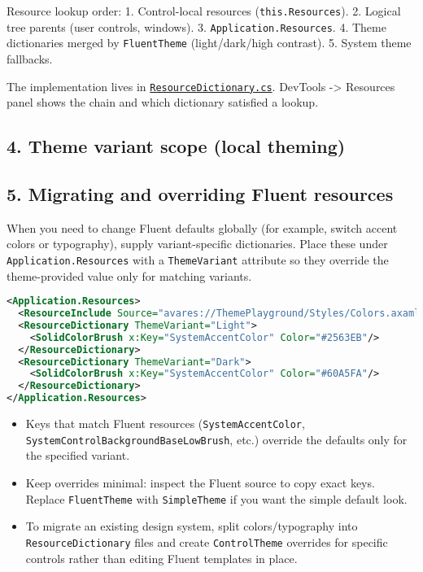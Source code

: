 Resource lookup order: 1. Control-local resources
(\passthrough{\lstinline!this.Resources!}). 2. Logical tree parents
(user controls, windows). 3.
\passthrough{\lstinline!Application.Resources!}. 4. Theme dictionaries
merged by \passthrough{\lstinline!FluentTheme!} (light/dark/high
contrast). 5. System theme fallbacks.

The implementation lives in
\href{https://github.com/AvaloniaUI/Avalonia/blob/master/src/Avalonia.Base/Resources/ResourceDictionary.cs}{\passthrough{\lstinline!ResourceDictionary.cs!}}.
DevTools -\textgreater{} Resources panel shows the chain and which
dictionary satisfied a lookup.

\subsection{4. Theme variant scope (local
theming)}\label{theme-variant-scope-local-theming}

\subsection{5. Migrating and overriding Fluent
resources}\label{migrating-and-overriding-fluent-resources}

When you need to change Fluent defaults globally (for example, switch
accent colors or typography), supply variant-specific dictionaries.
Place these under \passthrough{\lstinline!Application.Resources!} with a
\passthrough{\lstinline!ThemeVariant!} attribute so they override the
theme-provided value only for matching variants.

\begin{lstlisting}[language=XML]
<Application.Resources>
  <ResourceInclude Source="avares://ThemePlayground/Styles/Colors.axaml"/>
  <ResourceDictionary ThemeVariant="Light">
    <SolidColorBrush x:Key="SystemAccentColor" Color="#2563EB"/>
  </ResourceDictionary>
  <ResourceDictionary ThemeVariant="Dark">
    <SolidColorBrush x:Key="SystemAccentColor" Color="#60A5FA"/>
  </ResourceDictionary>
</Application.Resources>
\end{lstlisting}

\begin{itemize}
\tightlist
\item
  Keys that match Fluent resources
  (\passthrough{\lstinline!SystemAccentColor!},
  \passthrough{\lstinline!SystemControlBackgroundBaseLowBrush!}, etc.)
  override the defaults only for the specified variant.
\item
  Keep overrides minimal: inspect the Fluent source to copy exact keys.
  Replace \passthrough{\lstinline!FluentTheme!} with
  \passthrough{\lstinline!SimpleTheme!} if you want the simple default
  look.
\item
  To migrate an existing design system, split colors/typography into
  \passthrough{\lstinline!ResourceDictionary!} files and create
  \passthrough{\lstinline!ControlTheme!} overrides for specific controls
  rather than editing Fluent templates in place.
\end{itemize}

